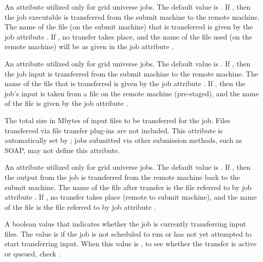 \begin{description}
\item[\AdAttr{TransferExecutable}:]   
An attribute utilized only for grid universe jobs.
The default value is .
If , then the job executable is transferred from the submit
machine to the remote machine.
The name of the file (on the submit machine)
that is transferred is given by the
job attribute .
If , no transfer takes place, and
the name of the file used (on the remote machine) will be as
given in the job attribute .

\item[\AdAttr{TransferIn}:]   
An attribute utilized only for grid universe jobs.
The default value is .
If , then the job input is transferred from the submit
machine to the remote machine.
The name of the file that is transferred is given by the
job attribute .
If , then the job's input is taken from a file on the
remote machine (pre-staged), and 
the name of the file is given by the job attribute .

\item[\AdAttr{TransferInputSizeMB}:]
The total size in Mbytes of input files to be transferred for the
job.  Files transferred via file transfer plug-ins are not included.
This attribute is automatically set by ; jobs submitted
via other submission methods, such as SOAP, may not define this
attribute.

\item[\AdAttr{TransferOut}:]   
An attribute utilized only for grid universe jobs.
The default value is .
If , then the output from the job
is transferred from the remote machine back to the submit machine.
The name of the file after transfer is the file referred to
by job attribute .
If , no transfer takes place (remote to submit machine),
and the name of the file is the file referred to
by job attribute .

\item[\AdAttr{TransferringInput}:]
A boolean value that indicates whether the job is currently
transferring input files.  The value is  if the job is
not scheduled to run or has not yet attempted to start transferring
input.  When this value is , to see whether the transfer is
active or queued, check .


\end{description}
